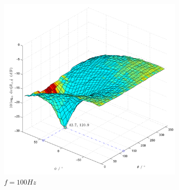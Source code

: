   
\begin{figure}
        \centering
        \begin{subfigure}[b]{0.48\textwidth}
                \centering
                \includegraphics[width=\textwidth]{grafiken/02_Konzeptionierung/Sim_sine_f_100_Phi_45_Theta_120_dB_SNR_100dB}
                \caption{$f=100Hz$}
                \label{fig:Sim_sine_f_100_Phi_45_Theta_120_dB_SNR_100dB}
        \end{subfigure}
        ~ %
        \begin{subfigure}[b]{0.48\textwidth}
                \centering

\end{subfigure}
\end{figure}

